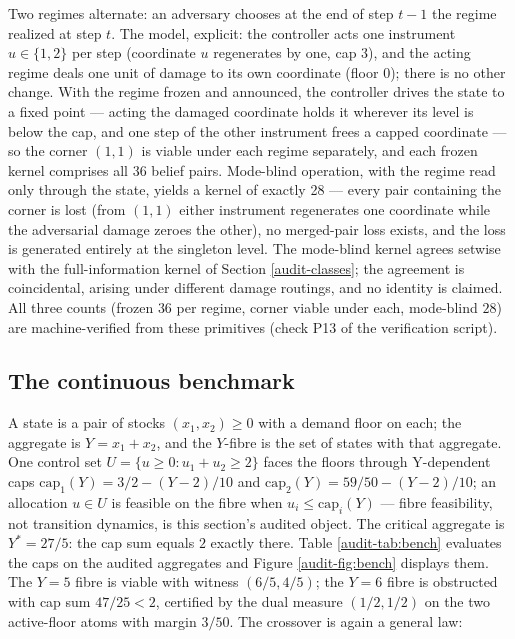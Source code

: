 \documentclass[10pt,twocolumn]{article}
\theoremstyle{plain}
\theoremstyle{definition}
\theoremstyle{remark}
\begin{document}
Two regimes alternate: an adversary chooses at the end of step
\(t - 1\) the regime realized at step \(t\). The model, explicit: the
controller acts one instrument \(u \in \{1,2\}\) per step (coordinate
\(u\) regenerates by one, cap \(3\)), and the acting regime deals one
unit of damage to its own coordinate (floor \(0\)); there is no other
change. With the regime frozen and announced, the controller drives the state
to a fixed point --- acting the damaged coordinate holds it wherever
its level is below the cap, and one step of the other instrument frees
a capped coordinate --- so the corner \((1,1)\) is
viable under each regime separately, and each frozen kernel comprises
all \(36\) belief pairs. Mode-blind operation, with the regime read
only through the state, yields a kernel of exactly 28 --- every pair
containing the corner is lost (from \((1,1)\) either instrument
regenerates one coordinate while the adversarial damage zeroes the
other), no merged-pair loss exists, and the loss is generated entirely
at the singleton level. The mode-blind kernel
agrees setwise with the full-information kernel of Section
\ref{audit-classes}; the agreement is coincidental, arising under different
damage routings, and no identity is claimed. All three counts (frozen
\(36\) per regime, corner viable under each, mode-blind \(28\)) are
machine-verified from these primitives (check P13 of the verification script).

\subsection{The continuous benchmark}\label{audit-benchmark}

A state is a pair of stocks \((x_1, x_2) \ge 0\) with a demand floor
on each; the aggregate is \(Y = x_1 + x_2\), and the \(Y\)-fibre is
the set of states with that aggregate. One control set
\(U = \{u \ge 0 : u_1 + u_2 \ge 2\}\) faces the floors through
Y-dependent caps \(\mathrm{cap}_1(Y) = 3/2 - (Y - 2)/10\) and
\(\mathrm{cap}_2(Y) = 59/50 - (Y - 2)/10\); an allocation \(u \in U\)
is feasible on the fibre when \(u_i \le \mathrm{cap}_i(Y)\) --- fibre
feasibility, not transition dynamics, is this section's audited object.
The critical aggregate is \(Y^{*} = 27/5\): the cap sum equals \(2\)
exactly there. Table
\ref{audit-tab:bench} evaluates the caps on the audited aggregates and Figure
\ref{audit-fig:bench} displays them. The \(Y = 5\) fibre is viable with
witness \((6/5, 4/5)\); the \(Y = 6\) fibre is obstructed with cap sum
\(47/25 < 2\), certified by the dual measure \((1/2, 1/2)\) on the two
active-floor atoms with margin \(3/50\). The crossover is again a general law:
\end{document}
